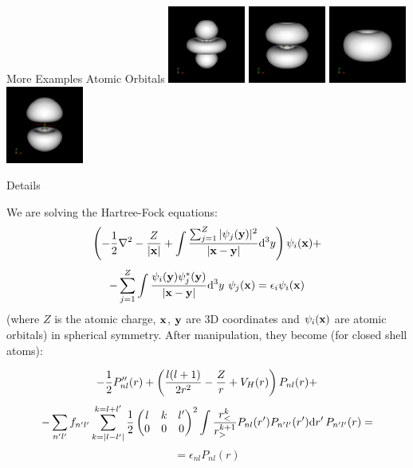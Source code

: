 \documentclass{beamer}
\def\d{{\rm d}}
\begin{document}
\begin{frame}{More Examples Atomic Orbitals}
\includegraphics[width=1in]{../img/orbital_n5l2m0.png}
\includegraphics[width=1in]{../img/orbital_n5l2m1.png}
\includegraphics[width=1in]{../img/orbital_n5l2m2.png}
\includegraphics[width=1in]{../img/orbital_n6l1m0.png}


\end{frame}

\begin{frame}{Details}

We are solving the Hartree-Fock equations:
\[
    \left(-{1\over 2} \nabla^2 -{Z\over |{\bf x}|}
    +
    \int {\sum_{j=1}^Z|\psi_j({\bf y})|^2\over|{\bf x}-{\bf y}|}
            \d^3 y\right)\psi_i({\bf x}) +
\]
\[
    - \sum_{j=1}^Z\int {\psi_i({\bf y})\psi_j^*({\bf y})\over|{\bf x}-{\bf y}|}
            \d^3 y\,\,\psi_j({\bf x})
    =
    \epsilon_i \psi_i({\bf x})
\]
(where $Z$ is the atomic charge, ${\bf x}$, ${\bf y}$ are 3D coordinates and
$\psi_i({\bf x})$ are atomic orbitals) in spherical symmetry. After
manipulation, they become (for closed shell atoms):

\[
    -{1\over2} P_{nl}''(r) +
        \left({l(l+1)\over 2r^2} -{Z\over r} + V_H(r)\right)P_{nl}(r) +
\]
\[
            -\sum_{n'l'}
                f_{n'l'}
                \sum_{k=|l-l'|}^{k=l+l'}
                {1\over2}\begin{pmatrix} l & k & l' \\ 0 & 0 & 0 \end{pmatrix}^2
                \int
                {r_{<}^k\over r_{>}^{k+1}}
                P_{nl}(r')
                P_{n'l'}(r')
                \d r'\,
                    P_{n'l'}(r)
        =
\]
\[
        = \epsilon_{nl} P_{nl}(r)
\]


\end{frame}
\end{document}
